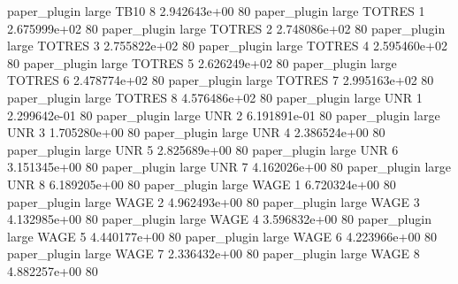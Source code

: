        paper_plugin      large     TB10                 8 2.942643e+00 80
       paper_plugin      large   TOTRES                 1 2.675999e+02 80
       paper_plugin      large   TOTRES                 2 2.748086e+02 80
       paper_plugin      large   TOTRES                 3 2.755822e+02 80
       paper_plugin      large   TOTRES                 4 2.595460e+02 80
       paper_plugin      large   TOTRES                 5 2.626249e+02 80
       paper_plugin      large   TOTRES                 6 2.478774e+02 80
       paper_plugin      large   TOTRES                 7 2.995163e+02 80
       paper_plugin      large   TOTRES                 8 4.576486e+02 80
       paper_plugin      large      UNR                 1 2.299642e-01 80
       paper_plugin      large      UNR                 2 6.191891e-01 80
       paper_plugin      large      UNR                 3 1.705280e+00 80
       paper_plugin      large      UNR                 4 2.386524e+00 80
       paper_plugin      large      UNR                 5 2.825689e+00 80
       paper_plugin      large      UNR                 6 3.151345e+00 80
       paper_plugin      large      UNR                 7 4.162026e+00 80
       paper_plugin      large      UNR                 8 6.189205e+00 80
       paper_plugin      large     WAGE                 1 6.720324e+00 80
       paper_plugin      large     WAGE                 2 4.962493e+00 80
       paper_plugin      large     WAGE                 3 4.132985e+00 80
       paper_plugin      large     WAGE                 4 3.596832e+00 80
       paper_plugin      large     WAGE                 5 4.440177e+00 80
       paper_plugin      large     WAGE                 6 4.223966e+00 80
       paper_plugin      large     WAGE                 7 2.336432e+00 80
       paper_plugin      large     WAGE                 8 4.882257e+00 80